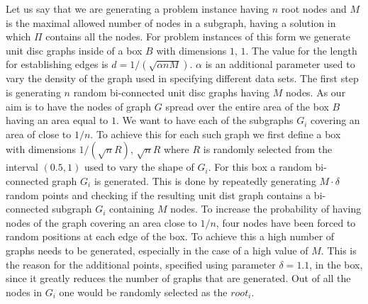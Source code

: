 Let us say that we are generating a problem instance having $n$ root nodes and $M$ is the maximal allowed number of nodes in a subgraph, having a solution in which $\Pi$ contains all the nodes. 
For problem instances of this form  we generate unit disc graphs inside of a box  $B$ with dimensions $1$, $1$. 
The value for the length for establishing edges is $d = 1/(\sqrt{\alpha n M})$. $\alpha$ is an additional parameter used to vary the density of the graph used in specifying different data sets. The first step is generating  $n$ random bi-connected unit disc graphs having $M$ nodes.  As our aim is to have the nodes of graph $G$ spread over the entire area of the box $B$ having an area equal to $1$. We want to have each of the subgraphs $G_i$ covering an area of close to $1/n$. To achieve this  for each such graph we first define a box with dimensions $1/(\sqrt{n} R)$, $\sqrt{n}R$  where $R$ is randomly selected  from the interval $(0.5, 1)$ used to vary the shape of $G_i$.  For this box a random bi-connected graph $G_i$ is generated. This is done by repeatedly generating $M\cdot \delta$ random points and checking if the resulting unit dist graph contains a bi-connected subgraph $G_i$ containing $M$ nodes. To increase the probability of having nodes of the graph covering an area close to $1/n$, four nodes have been forced to random positions at each edge of the  box.  To achieve this a high number of graphs needs to be generated, especially in the case of a high value of $M$. This is the reason for the additional points, specified using parameter $\delta = 1.1 $, in the box, since it greatly reduces the number of graphs that are generated.  Out of all the nodes in $G_i$ one would be randomly selected as the $root_i$.

